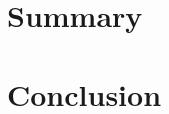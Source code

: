 \documentclass[10pt,oneside,english,a4paper]{article}
\begin{document}
\section{Summary} \label{sec:summary}


\section{Conclusion} \label{conclusion} %






\end{document}
